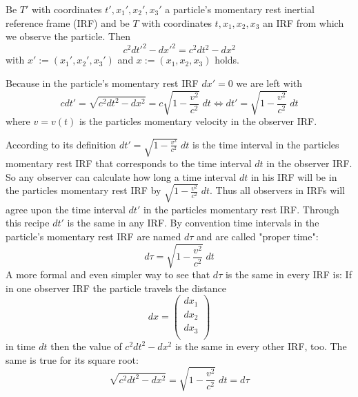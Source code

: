 \documentclass{article}
\begin{document}
Be $T'$ with coordinates $t', x_1',x_2',x_3'$ a particle's momentary rest inertial reference frame (IRF) and be $T$ with coordinates $t, x_1,x_2,x_3$ an IRF from which we observe the particle.
Then
\begin{equation}
    c^2dt'^2 - dx'^2 = c^2dt^2 - dx^2
\end{equation}
with $x' := (x_1',x_2',x_3')$ and $x := (x_1,x_2,x_3)$ holds.

Because in the particle's momentary rest IRF $dx'=0$ we are left with
\begin{equation} \label{defProperTime}
c dt' = \sqrt{c^2dt^2 - dx^2} = c \sqrt{1- \frac{v^2}{c^2}} \; dt \iff dt' = \sqrt{1- \frac{v^2}{c^2}} \; dt
\end{equation}
where $v=v(t)$ is the particles momentary velocity in the observer IRF.

According to its definition $dt' = \sqrt{1-\frac{v^2}{c^2}} \; dt$ is the time interval in the particles momentary rest IRF that corresponds to the time interval $dt$ in the observer IRF.
So any observer can calculate how long a time interval $dt$ in his IRF will be in the particles momentary rest IRF by $\sqrt{1-\frac{v^2}{c^2}} \; dt$.
Thus all observers in IRFs will agree upon the time interval $dt'$ in the particles momentary rest IRF.
Through this recipe $dt'$ is the same in any IRF. By convention time intervals in the particle's momentary rest IRF are named $d\tau$ and are called "proper time":
\begin{equation}
    d\tau = \sqrt{1-\frac{v^2}{c^2}} \; dt
\end{equation}
A more formal and even simpler way to see that $d\tau$ is the same in every IRF is: If in one observer IRF the particle travels the distance
\begin{equation}
    dx = \left(\begin{array}{c}
                   dx_1\\
                   dx_2\\
                   dx_3\\
    \end{array} \right)
\end{equation}
in time $dt$ then the value of $c^2 dt^2 - dx^2$ is the same in every other IRF, too.
The same is true for its square root:
\begin{equation}
    \sqrt{c^2 dt^2 - dx^2} = \sqrt{1-\frac{v^2}{c^2}} \; dt = d\tau
\end{equation}
\end{document}
